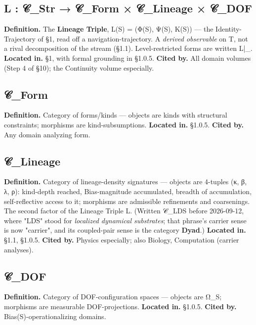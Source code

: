 \documentclass[11pt, openany]{book}
\begin{document}
\subsection{L : 𝒞\_\allowbreak{}Str → 𝒞\_\allowbreak{}Form × 𝒞\_\allowbreak{}Lineage × 𝒞\_\allowbreak{}DOF}
\textbf{Definition.} The \textbf{Lineage Triple}, L(S) = (Φ(S), Ψ(S), Κ(S)) --- the Identity-Trajectory of §1, read off a navigation-trajectory. A \textit{derived observable} on T, not a rival decomposition of the stream (§1.1). Level-restricted forms are written L|\_.
\textbf{Located in.} §1, with formal grounding in §1.0.5.
\textbf{Cited by.} All domain volumes (Step 4 of §10); the Continuity volume especially.

\subsection{𝒞\_\allowbreak{}Form}
\textbf{Definition.} Category of forms/kinds --- objects are kinds with structural constraints; morphisms are kind-subsumptions.
\textbf{Located in.} §1.0.5.
\textbf{Cited by.} Any domain analyzing form.

\subsection{𝒞\_\allowbreak{}Lineage}
\textbf{Definition.} Category of lineage-density signatures --- objects are 4-tuples (κ, β, λ, ρ): kind-depth reached, Bias-magnitude accumulated, breadth of accumulation, self-reflective access to it; morphisms are admissible refinements and coarsenings. The second factor of the Lineage Triple L. (Written 𝒞\_\allowbreak{}LDS before 2026-09-12, where "LDS" stood for \textit{localized dynamical substrates}; that phrase's carrier sense is now "carrier", and its coupled-pair sense is the category \textbf{Dyad}.)
\textbf{Located in.} §1.1, §1.0.5.
\textbf{Cited by.} Physics especially; also Biology, Computation (carrier analyses).

\subsection{𝒞\_\allowbreak{}DOF}
\textbf{Definition.} Category of DOF-configuration spaces --- objects are Ω\_\allowbreak{}S; morphisms are measurable DOF-projections.
\textbf{Located in.} §1.0.5.
\textbf{Cited by.} Bias(S)-operationalizing domains.
\end{document}
